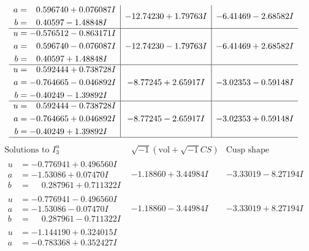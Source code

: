 \documentclass[1p]{elsarticle_modified}
\theoremstyle{definition}
\newcommand{\I}{\sqrt{-1}}
\begin{document}
$$\begin{array}{c|c|c}
\begin{aligned}
a &= \phantom{-}0.596740 + 0.076087 I \\
b &= \phantom{-}0.40597 - 1.48848 I\end{aligned}
 & -12.74230 + 1.79763 I & -6.41469 - 2.68582 I \\ \hline\begin{aligned}
u &= -0.576512 - 0.863171 I \\
a &= \phantom{-}0.596740 - 0.076087 I \\
b &= \phantom{-}0.40597 + 1.48848 I\end{aligned}
 & -12.74230 - 1.79763 I & -6.41469 + 2.68582 I \\ \hline\begin{aligned}
u &= \phantom{-}0.592444 + 0.738728 I \\
a &= -0.764665 - 0.046892 I \\
b &= -0.40249 - 1.39892 I\end{aligned}
 & -8.77245 + 2.65917 I & -3.02353 - 0.59148 I \\ \hline\begin{aligned}
u &= \phantom{-}0.592444 - 0.738728 I \\
a &= -0.764665 + 0.046892 I \\
b &= -0.40249 + 1.39892 I\end{aligned}
 & -8.77245 - 2.65917 I & -3.02353 + 0.59148 I\\
 \hline 
 \end{array}$$\newpage$$\begin{array}{c|c|c}  
\text{Solutions to }I^u_{3}& \I (\text{vol} + \sqrt{-1}CS) & \text{Cusp shape}\\
 \hline 
\begin{aligned}
u &= -0.776941 + 0.496560 I \\
a &= -1.53086 + 0.07470 I \\
b &= \phantom{-}0.287961 + 0.711322 I\end{aligned}
 & -1.18860 + 3.44984 I & -3.33019 - 8.27194 I \\ \hline\begin{aligned}
u &= -0.776941 - 0.496560 I \\
a &= -1.53086 - 0.07470 I \\
b &= \phantom{-}0.287961 - 0.711322 I\end{aligned}
 & -1.18860 - 3.44984 I & -3.33019 + 8.27194 I \\ \hline\begin{aligned}
u &= -1.144190 + 0.324015 I \\
a &= -0.783368 + 0.352427 I \\

\end{aligned}
\end{array}$$
\end{document}
